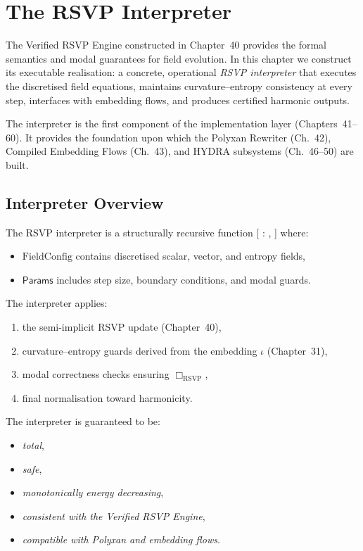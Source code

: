 \chapter{The RSVP Interpreter}
\label{ch:41}

The Verified RSVP Engine constructed in Chapter~40 provides the formal semantics and modal guarantees for field evolution.
In this chapter we construct its executable realisation: a concrete, operational \emph{RSVP interpreter} that executes the discretised field equations, maintains curvature--entropy consistency at every step, interfaces with embedding flows, and produces certified harmonic outputs.

The interpreter is the first component of the implementation layer (Chapters~41--60).
It provides the foundation upon which the Polyxan Rewriter (Ch.~42), Compiled Embedding Flows (Ch.~43), and HYDRA subsystems (Ch.~46--50) are built.

\section{Interpreter Overview}

The RSVP interpreter is a structurally recursive function
[
 :  \times {} \to {},
]
where:
\begin{itemize}
\item $\mathrm{FieldConfig}$ contains discretised scalar, vector, and entropy fields,
\item $\mathsf{Params}$ includes step size, boundary conditions, and modal guards.
\end{itemize}

The interpreter applies:
\begin{enumerate}
\item the semi-implicit RSVP update (Chapter~40),
\item curvature--entropy guards derived from the embedding $\iota$ (Chapter~31),
\item modal correctness checks ensuring $\Box_{\mathrm{RSVP}}$,
\item final normalisation toward harmonicity.
\end{enumerate}

The interpreter is guaranteed to be:
\begin{itemize}
\item \emph{total},
\item \emph{safe},
\item \emph{monotonically energy decreasing},
\item \emph{consistent with the Verified RSVP Engine},
\item \emph{compatible with Polyxan and embedding flows}.
\end{itemize}

